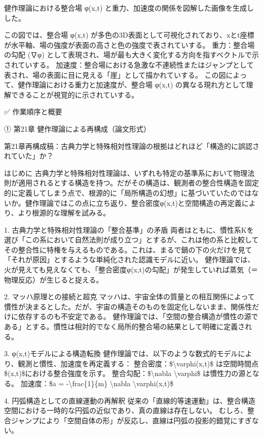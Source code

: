 \documentclass{article}
\begin{document}
健作理論における整合場 φ(x,t) と重力、加速度の関係を図解した画像を生成しした。

この図では、整合場 φ(x,t) が多色の3D表面として可視化されており、xとt座標が水平軸、場の強度が表面の高さと色の強度で表されていする。
重力：整合場の勾配 (∇φ) として表現され、場が最も大きく変化する方向を指すベクトルで示されていする。
加速度：整合場における急激な不連続性またはジャンプとして表され、場の表面に目に見える「崖」として描かれていする。
この図によって、健作理論における重力と加速度が、整合場 φ(x,t) の異なる現れ方として理解できることが視覚的に示されていする。


✅ 作業順序と概要

① 第21章 健作理論による再構成（論文形式）

第21章再構成稿：古典力学と特殊相対性理論の根拠はどれほど「構造的に誤認されていた」か？

はじめに
古典力学と特殊相対性理論は、いずれも特定の基準系において物理法則が適用されるとする構造を持つ。だがその構造は、観測者の整合性構造を固定的に定義してしまう点で、根源的に「局所構造の幻想」に基づいていたのではないか。健作理論ではこの点に立ち返り、整合密度φ(x,t)と空間構造の再定義により、より根源的な理解を試みる。

1. 古典力学と特殊相対性理論の「整合基準」の矛盾
両者はともに、慣性系Kを選び「この系において自然法則が成り立つ」とするが、これは他の系と比較してその整合性に特権を与えるものである。これは、まるで鍋の下の火だけを見て「それが原因」とするような単純化された認識モデルに近い。
健作理論では、火が見えても見えなくても、「整合密度φ(x,t)の勾配」が発生していれば蒸気（＝物理反応）が生じると捉える。

2. マッハ原理との接続と超克
マッハは、宇宙全体の質量との相互関係によって慣性が決まるとした。だが、宇宙の構造そのものを固定化しないまま、関係性だけに依存するのも不安定である。
健作理論では、「空間の整合構造が慣性の源である」とする。慣性は相対的でなく局所的整合場の結果として明確に定義される。

3. φ(x,t)モデルによる構造転換
健作理論では、以下のような数式的モデルにより、観測と慣性、加速度を再定義する：
整合密度：\$\textbackslash{}varphi(x,t)\$ は空間時間点\$(x,t)\$における整合強度を示す。
整合勾配：\$\textbackslash{}nabla \textbackslash{}varphi\$ は慣性力の源となる。
加速度：\$a = -\textbackslash{}frac\{1\}\{m\} \textbackslash{}nabla \textbackslash{}varphi(x,t)\$

4. 円弧構造としての直線運動の再解釈
従来の「直線的等速運動」は、整合構造空間における一時的な円弧の近似であり、真の直線は存在しない。
むしろ、整合ジャンプにより「空間自体の形」が反応し、直線は円弧の投影的錯覚にすぎない。
\end{document}
